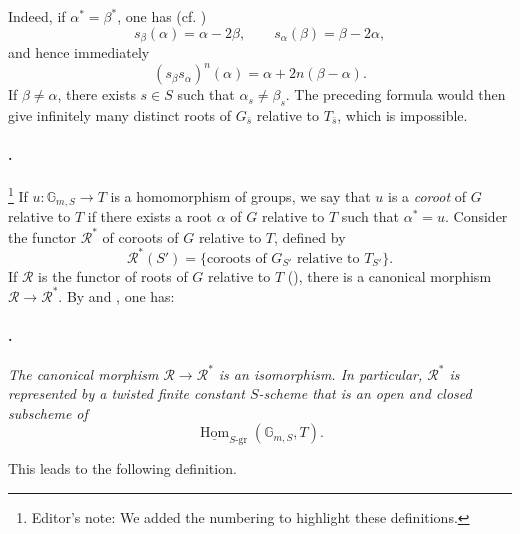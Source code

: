 Indeed, if \(\alpha^*=\beta^*\), one has (cf. )
\[
  s_\beta(\alpha)=\alpha-2\beta,
  \qquad
  s_\alpha(\beta)=\beta-2\alpha,
\]
and hence immediately
\[
  (s_\beta s_\alpha)^n(\alpha)
  =
  \alpha+2n(\beta-\alpha).
\]
If \(\beta\ne\alpha\), there exists \(s\in S\) such that
\(\alpha_s\ne\beta_s\). The preceding formula would then give
infinitely many distinct roots of \(G_{\bar s}\) relative to
\(T_{\bar s}\), which is impossible.

\paragraph{.}
\footnote{Editor's note: We added the numbering  to highlight
these definitions.}
If \(u:\mathbb G_{m,S}\to T\) is a homomorphism of groups, we say
that \(u\) is a \emph{coroot} of \(G\) relative to \(T\) if there
exists a root \(\alpha\) of \(G\) relative to \(T\) such that
\(\alpha^*=u\). Consider the functor \(\mathcal R^*\) of coroots of
\(G\) relative to \(T\), defined by
\[
  \mathcal R^*(S')
  =
  \{\text{coroots of \(G_{S'}\) relative to \(T_{S'}\)}\}.
\]
If \(\mathcal R\) is the functor of roots of \(G\) relative to \(T\)
(), there is a canonical morphism
\(\mathcal R\to\mathcal R^*\). By  and , one has:

\paragraph{.}
\textit{The canonical morphism
\(\mathcal R\to\mathcal R^*\) is an isomorphism. In particular,
\(\mathcal R^*\) is represented by a twisted finite constant
\(S\)-scheme that is an open and closed subscheme of}
\[
  \underline{\operatorname{Hom}}_{S\text{-gr}}
    (\mathbb G_{m,S},T).
\]

This leads to the following definition.

